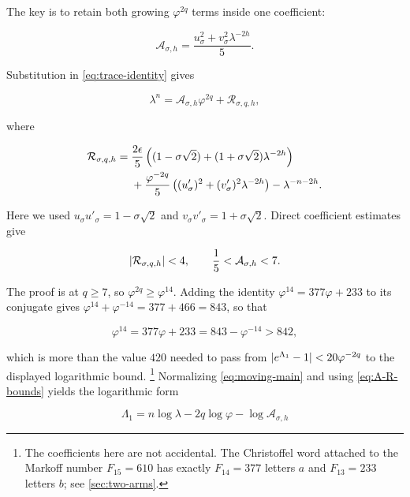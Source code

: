The key is to retain both growing $\varphi^{2q}$ terms inside one
coefficient:

\begin{equation}
 \mathcal A_{\sigma,h}
 =\frac{u_\sigma^2+v_\sigma^2\lambda^{-2h}}5.
 \label{eq:moving-coefficient}
\end{equation}

Substitution in \cref{eq:trace-identity} gives

\begin{equation}
 \lambda^n=\mathcal A_{\sigma,h}\varphi^{2q}
 +\mathcal R_{\sigma,q,h},
 \label{eq:moving-main}
\end{equation}

where

\begin{align}
 \mathcal R_{\sigma,q,h}={}&
 \frac{2\epsilon}{5}
 \left((1-\sigma\sqrt2)
 +(1+\sigma\sqrt2)\lambda^{-2h}\right)
 \notag\\
 &+\frac{\varphi^{-2q}}5
 \left((u'_\sigma)^2+(v'_\sigma)^2\lambda^{-2h}\right)
 -\lambda^{-n-2h}.
 \label{eq:moving-remainder}
\end{align}

Here we used
$u_\sigma u'_\sigma=1-\sigma\sqrt2$ and
$v_\sigma v'_\sigma=1+\sigma\sqrt2$. Direct coefficient estimates give

\begin{equation}
 \lvert\mathcal R_{\sigma,q,h}\rvert<4,
 \qquad
 \frac15<\mathcal A_{\sigma,h}<7.
 \label{eq:A-R-bounds}
\end{equation}

The proof is at $q\geqslant7$, so $\varphi^{2q}\geqslant\varphi^{14}$. Adding
the identity $\varphi^{14}=377\varphi+233$ to its conjugate gives
$\varphi^{14}+\varphi^{-14}=377+466=843$, so that

\begin{equation}
 \varphi^{14}=377\varphi+233=843-\varphi^{-14}>842,
 \label{eq:phi14}
\end{equation}

which is more than the value $420$ needed to pass from
$\lvert e^{\Lambda_1}-1\rvert<20\varphi^{-2q}$ to the displayed logarithmic bound.%
\footnote{The coefficients here are not accidental. The Christoffel word
attached to the Markoff number $F_{15}=610$ has exactly $F_{14}=377$ letters
$a$ and $F_{13}=233$ letters $b$; see \cref{sec:two-arms}.}
Normalizing \cref{eq:moving-main} and using \cref{eq:A-R-bounds} yields the
logarithmic form

\begin{equation}
 \Lambda_1=n\log\lambda-2q\log\varphi
 -\log\mathcal A_{\sigma,h}
 \label{eq:Lambda1}
\end{equation}

